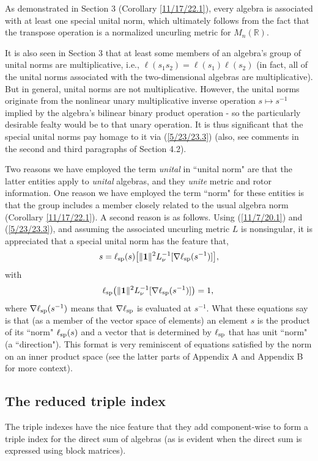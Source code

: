 \documentclass{amsart}
\numberwithin{equation}{section}
\theoremstyle{definition}
\numberwithin{theorem}{section}
\begin{document}
As demonstrated in Section 3 (Corollary \ref{11/17/22.1}), every algebra is associated with at least one special unital norm, which ultimately follows from the fact that the transpose operation is a normalized uncurling metric for $M_n(\mathbb{R})$.

It is also seen in Section 3 that at least some members of an algebra's group of unital norms are multiplicative, i.e., $\ell(s_1s_2) = \ell(s_1)\ell(s_2)$ (in fact, all of the unital norms associated with the two-dimensional algebras are multiplicative).   But in general, unital norms are not multiplicative.  However, the unital norms originate from the nonlinear unary multiplicative inverse operation $s\mapsto s^{-1}$ implied by the algebra's bilinear binary product operation - so the particularly desirable fealty would be to that unary operation.  It is thus significant that the special unital norms pay homage to it via (\ref{5/23/23.3}) (also, see comments in the second and third paragraphs of Section 4.2).

Two reasons we have employed the term {\it unital} in ``unital norm" are that the latter entities apply to {\it unital} algebras, and they {\it unite} metric and rotor information.  One reason we have employed the term ``norm" for these entities is that the group includes a member closely related to the usual algebra norm (Corollary \ref{11/17/22.1}).  A second reason is as follows.   Using (\ref{11/7/20.1}) and (\ref{5/23/23.3}), and assuming the associated uncurling metric $L$ is nonsingular, it is appreciated that a special unital norm has the feature that,
\begin{equation}\label{5/22/24.5}  s = \ell_{\rm sp}(s)\big[\|\mathbf{1}\|^2 L_{\nu}^{-1}[\nabla\ell_{\rm sp}(s^{-1})]\big],\end{equation} with
\begin{equation}\label{5/22/24.6}\ell_{\rm sp}\big(\|\mathbf{1}\|^2 L_{\nu}^{-1}[\nabla\ell_{\rm sp}(s^{-1})]\big) = 1,\,\end{equation}
where $\nabla\ell_{\rm sp}(s^{-1})$ means that $\nabla\ell_{\rm sp}$ is evaluated at $s^{-1}$.  What these equations say is that (as a member of the vector space of elements) an element $s$ is the product of its ``norm" $\ell_{\rm sp}(s)$ and a vector that is determined by $\ell_{\rm sp}$ that has unit ``norm" (a ``direction").  This format is very reminiscent of equations satisfied by the norm on an inner product space (see the latter parts of Appendix A and Appendix B for more context).


\subsection{The reduced triple index}
The triple indexes have the nice feature that they add component-wise to form a triple index for the direct sum of algebras (as is evident when the direct sum is expressed using block matrices).
 
\end{document}
